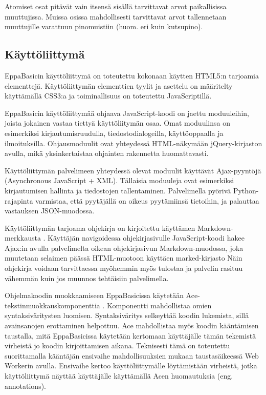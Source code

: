 Atomiset osat pitävät vain
itsensä sisällä tarvittavat
arvot paikallisissa muuttujissa.
Muissa osissa mahdollisesti tarvittavat
arvot tallennetaan muuttujille
varattuun pinomuistiin
(huom. eri kuin kutsupino).


\subsection{Käyttöliittymä}
EppaBasicin käyttöliittymä on toteutettu
kokonaan käytten HTML5:n tarjoamia elementtejä.
Käyttöliittymän elementtien tyylit ja asettelu
on määritelty käyttämällä CSS3:a ja
toiminallisuus on toteutettu
JavaScriptillä.

EppaBasicin käyttöliittymää ohjaava JavaScript-koodi
on jaettu moduuleihin, joista jokainen vastaa
tiettyä käyttöliitymän osaa.
Omat moduulinsa on esimerkiksi kirjautumisruudulla,
tiedostodialogeilla, käyttöoppaalla ja ilmoituksilla.
Ohjausmoduulit ovat yhteydessä HTML-näkymään
jQuery-kirjaston \cite{jquery} avulla,
mikä yksinkertaistaa ohjainten rakennetta huomattavasti.

Käyttöliittymän palvelimeen yhteydessä olevat
moduulit käyttävät Ajax-pyyntöjä
(Asyn\-chro\-nous JavaScript + XML).
Tällaisia moduuleja ovat esimerkiksi
kirjautumisen hallinta ja tiedostojen tallentaminen.
Palvelimella pyörivä Python-rajapinta varmistaa,
että pyytäjällä on oikeus pyytämiinsä tietoihin,
ja palauttaa vastauksen JSON-muodossa.

Käyttöliittymän tarjoama ohjekirja on kirjoitettu
käyttämen Markdown-merkkausta \cite{markdown}.
Käyttäjän navigoidessa ohjekirjasivulle
JavaScript-koodi hakee Ajax:in avulla palvelimelta
oikean ohjekirjasivun Markdown-muodossa,
joka muutetaan selaimen päässä HTML-muotoon käyttäen
marked-kirjasto \cite{marked}
Näin ohjekirja voidaan tarvittaessa myöhemmin
myös tulostaa ja palvelin rasituu vähemmän
kuin jos muunnos tehtäisiin palvelimella.

Ohjelmakoodin muokkaamiseen EppaBasicissa käytetään
Ace-teks\-tin\-muok\-kaus\-kom\-po\-nent\-tia \cite{ace_about}.
Komponentti mahdollistaa omien syntaksiväritysten luomisen.
Syntaksiväritys selkeyttää koodin lukemista,
sillä avainsanojen erottaminen helpottuu.
Ace mahdollistaa myös koodin kääntämisen taustalla,
mitä EppaBasicissa käytetään kertomaan käyttäjälle
tämän tekemistä virheistä jo koodin kirjoittamisen aikana.
Teknisesti tämä on toteutettu suorittamalla
kääntäjän ensivaihe mahdollisuuksien mukaan
taustasäikeessä Web Workerin \cite{w3c_web_worker} avulla.
Ensivaihe kertoo käyttöliittymälle löytämistään virheistä,
jotka käyttöliittymä näyttää käyttäjälle käyttämällä
Acen huomautuksia (eng. annotations).

